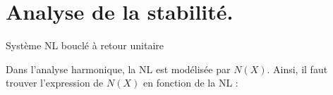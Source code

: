 \documentclass[main.tex]{subfiles}
\begin{document}
\newpage
\section{Analyse de la stabilité.}

Système NL bouclé à retour unitaire

\begin{figure}[h!]
\centering
{}
\end{figure}

Dans l'analyse harmonique, la NL est modélisée par $N(X)$. Ainsi, il faut trouver l'expression de $N(X)$ en fonction de la NL :
\end{document}
